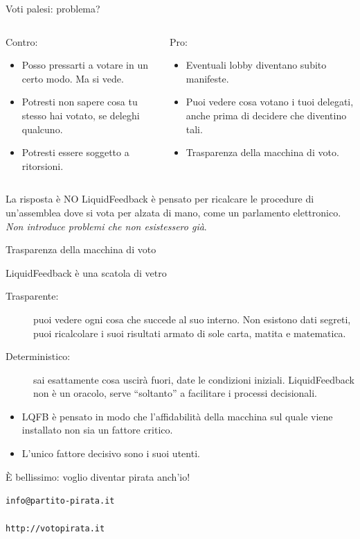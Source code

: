 \begin{frame}{Voti palesi: problema?}
\begin{columns}
\begin{column}[t]{.5\textwidth}

Contro:\begin{itemize}
\item Posso pressarti a votare in un certo modo. Ma si vede.
\item Potresti non sapere cosa tu stesso hai votato, se deleghi qualcuno.
\item Potresti essere soggetto a ritorsioni.
\end{itemize}
\end{column}
\begin{column}[t]{.5\textwidth}

Pro:\begin{itemize}
\item Eventuali lobby diventano subito manifeste.
\item Puoi vedere cosa votano i tuoi delegati, anche prima di decidere che diventino tali.
\item \alert{Trasparenza della macchina di voto}.
\end{itemize}
\end{column}
\end{columns}\pause
\begin{block}{La risposta è NO}
LiquidFeedback è pensato per ricalcare le procedure di un'assemblea dove si vota per alzata di mano, come un parlamento elettronico. \emph{Non introduce problemi che non esistessero già}.
\end{block}
\end{frame}

\begin{frame}{Trasparenza della macchina di voto}
\begin{block}{LiquidFeedback è una scatola di vetro}
\begin{description}
\item[Trasparente:] puoi vedere ogni cosa che succede al suo interno. Non esistono dati segreti, puoi ricalcolare i suoi risultati armato di sole carta, matita e matematica.
\item[Deterministico:] sai esattamente cosa uscirà fuori, date le condizioni iniziali. LiquidFeedback non è un oracolo, serve ``soltanto'' a facilitare i processi decisionali.
\end{description}
\end{block}
\begin{itemize}
\item LQFB è pensato in modo che l'affidabilità della macchina sul quale viene installato non sia un fattore critico.
\item \alert{L'unico fattore decisivo sono i suoi utenti}.
\end{itemize}
\end{frame}

\begin{frame}{È bellissimo: voglio diventar pirata anch'io!}

\begin{center}
{\huge \texttt{info@partito-pirata.it \\~\\ http://votopirata.it}}
\end{center}

\end{frame}

